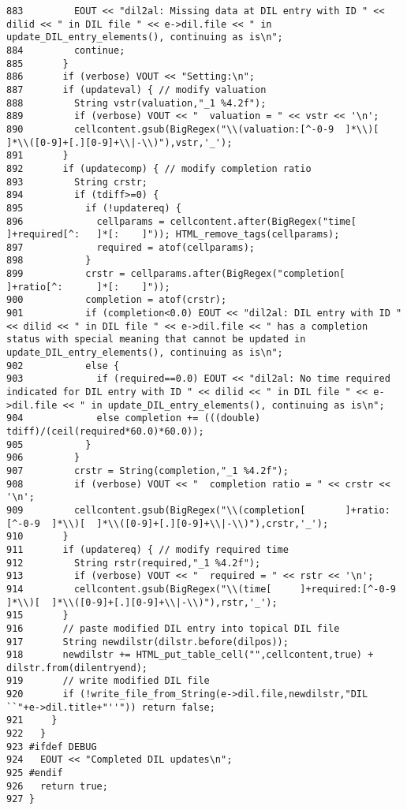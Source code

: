 \begin{verbatim}
883         EOUT << "dil2al: Missing data at DIL entry with ID " << dilid << " in DIL file " << e->dil.file << " in update_DIL_entry_elements(), continuing as is\n";
884         continue;
885       }
886       if (verbose) VOUT << "Setting:\n";
887       if (updateval) { // modify valuation
888         String vstr(valuation,"_1 %4.2f");
889         if (verbose) VOUT << "  valuation = " << vstr << '\n';
890         cellcontent.gsub(BigRegex("\\(valuation:[^-0-9  ]*\\)[  ]*\\([0-9]+[.][0-9]+\\|-\\)"),vstr,'_');
891       }
892       if (updatecomp) { // modify completion ratio
893         String crstr;
894         if (tdiff>=0) {
895           if (!updatereq) {
896             cellparams = cellcontent.after(BigRegex("time[      ]+required[^:   ]*[:    ]")); HTML_remove_tags(cellparams);
897             required = atof(cellparams);
898           }
899           crstr = cellparams.after(BigRegex("completion[        ]+ratio[^:      ]*[:    ]"));
900           completion = atof(crstr);
901           if (completion<0.0) EOUT << "dil2al: DIL entry with ID " << dilid << " in DIL file " << e->dil.file << " has a completion status with special meaning that cannot be updated in update_DIL_entry_elements(), continuing as is\n";
902           else {
903             if (required==0.0) EOUT << "dil2al: No time required indicated for DIL entry with ID " << dilid << " in DIL file " << e->dil.file << " in update_DIL_entry_elements(), continuing as is\n";
904             else completion += (((double) tdiff)/(ceil(required*60.0)*60.0));
905           }
906         }
907         crstr = String(completion,"_1 %4.2f");
908         if (verbose) VOUT << "  completion ratio = " << crstr << '\n';
909         cellcontent.gsub(BigRegex("\\(completion[       ]+ratio:[^-0-9  ]*\\)[  ]*\\([0-9]+[.][0-9]+\\|-\\)"),crstr,'_');
910       }
911       if (updatereq) { // modify required time
912         String rstr(required,"_1 %4.2f");
913         if (verbose) VOUT << "  required = " << rstr << '\n';
914         cellcontent.gsub(BigRegex("\\(time[     ]+required:[^-0-9       ]*\\)[  ]*\\([0-9]+[.][0-9]+\\|-\\)"),rstr,'_');
915       }
916       // paste modified DIL entry into topical DIL file
917       String newdilstr(dilstr.before(dilpos));
918       newdilstr += HTML_put_table_cell("",cellcontent,true) + dilstr.from(dilentryend);
919       // write modified DIL file
920       if (!write_file_from_String(e->dil.file,newdilstr,"DIL ``"+e->dil.title+"''")) return false;
921     }
922   }
923 #ifdef DEBUG
924   EOUT << "Completed DIL updates\n";
925 #endif
926   return true;
927 }
\end{verbatim}\normalsize 
